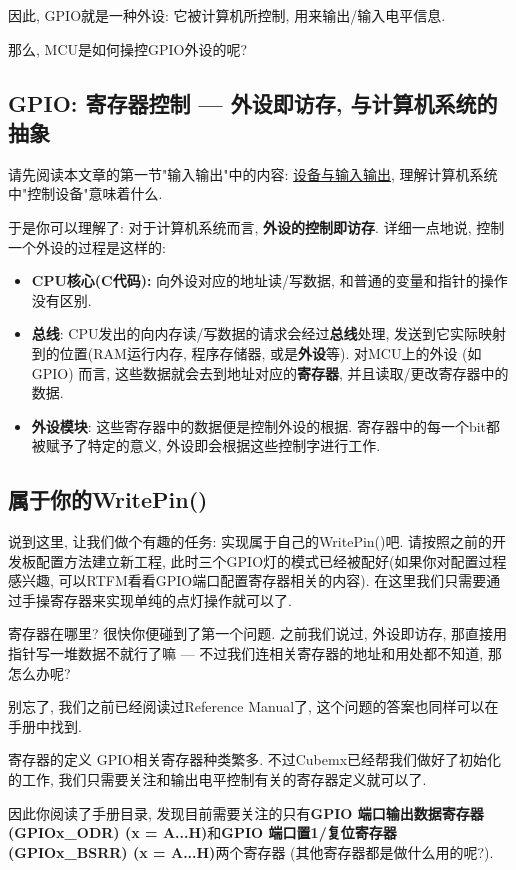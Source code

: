 因此, GPIO就是一种外设: 它被计算机所控制, 用来输出/输入电平信息.

那么, MCU是如何操控GPIO外设的呢?



\subsection{GPIO: 寄存器控制 --- 外设即访存, 与计算机系统的抽象}

请先阅读本文章的第一节"输入输出"中的内容: \href{https://nju-projectn.github.io/ics-pa-gitbook/ics2023/2.5.html}{设备与输入输出}, 理解计算机系统中"控制设备"意味着什么.

于是你可以理解了: 对于计算机系统而言, \textbf{外设的控制即访存}. 详细一点地说, 控制一个外设的过程是这样的:
\begin{itemize}
	\item \textbf{CPU核心(C代码):} 向外设对应的地址读/写数据, 和普通的变量和指针的操作没有区别.
	\item \textbf{总线}: CPU发出的向内存读/写数据的请求会经过\textbf{总线}处理, 发送到它实际映射到的位置(RAM运行内存, 程序存储器, 或是\textbf{外设}等). 对MCU上的外设 (如GPIO) 而言, 这些数据就会去到地址对应的\textbf{寄存器}, 并且读取/更改寄存器中的数据.
	\item \textbf{外设模块}: 这些寄存器中的数据便是控制外设的根据. 寄存器中的每一个bit都被赋予了特定的意义, 外设即会根据这些控制字进行工作.
\end{itemize}

\subsection{属于你的WritePin()}

说到这里, 让我们做个有趣的任务: 实现属于自己的WritePin()吧. 请按照之前的开发板配置方法建立新工程, 此时三个GPIO灯的模式已经被配好(如果你对配置过程感兴趣, 可以RTFM看看GPIO端口配置寄存器相关的内容). 在这里我们只需要通过手操寄存器来实现单纯的点灯操作就可以了.

\begin{definition}{寄存器在哪里?}
	很快你便碰到了第一个问题. 之前我们说过, 外设即访存, 那直接用指针写一堆数据不就行了嘛 --- 不过我们连相关寄存器的地址和用处都不知道, 那怎么办呢?

	别忘了, 我们之前已经阅读过Reference Manual了, 这个问题的答案也同样可以在手册中找到.


\end{definition}

\begin{theorem}{寄存器的定义}
	GPIO相关寄存器种类繁多. 不过Cubemx已经帮我们做好了初始化的工作, 我们只需要关注和输出电平控制有关的寄存器定义就可以了.

\end{theorem}
因此你阅读了手册目录, 发现目前需要关注的只有\textbf{GPIO 端口输出数据寄存器 (GPIOx\_ODR) (x = A...H)}和\textbf{GPIO 端口置1/复位寄存器 (GPIOx\_BSRR) (x = A...H)}两个寄存器 (其他寄存器都是做什么用的呢?).

